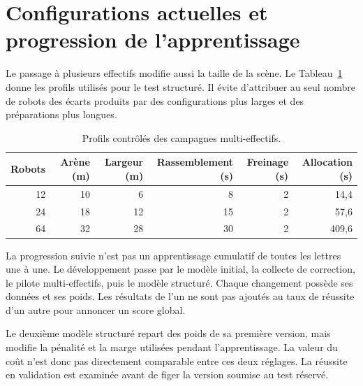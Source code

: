 \section{Configurations actuelles et progression de l'apprentissage}
Le passage à plusieurs effectifs modifie aussi la taille de la scène. Le Tableau~\ref{tab:profils} donne les profils utilisés pour le test structuré. Il évite d'attribuer au seul nombre de robots des écarts produits par des configurations plus larges et des préparations plus longues.
\begin{table}[htbp]
\caption{Profils contrôlés des campagnes multi-effectifs.}
\label{tab:profils}


\centering\small
\begin{tabular}{rrrrrr}
\toprule
Robots & Arène (m) & Largeur (m) & Rassemblement (s) & Freinage (s) & Allocation (s)\\\midrule
12 & 10 & 6 & 8 & 2 & 14,4\\
24 & 18 & 12 & 15 & 2 & 57,6\\
64 & 32 & 28 & 30 & 2 & 409,6\\\bottomrule
\end{tabular}
\end{table}

La progression suivie n'est pas un apprentissage cumulatif de toutes les lettres une à une. Le développement passe par le modèle initial, la collecte de correction, le pilote multi-effectifs, puis le modèle structuré. Chaque changement possède ses données et ses poids. Les résultats de l'un ne sont pas ajoutés au taux de réussite d'un autre pour annoncer un score global.

Le deuxième modèle structuré repart des poids de sa première version, mais modifie la pénalité et la marge utilisées pendant l'apprentissage. La valeur du coût n'est donc pas directement comparable entre ces deux réglages. La réussite en validation est examinée avant de figer la version soumise au test réservé.


